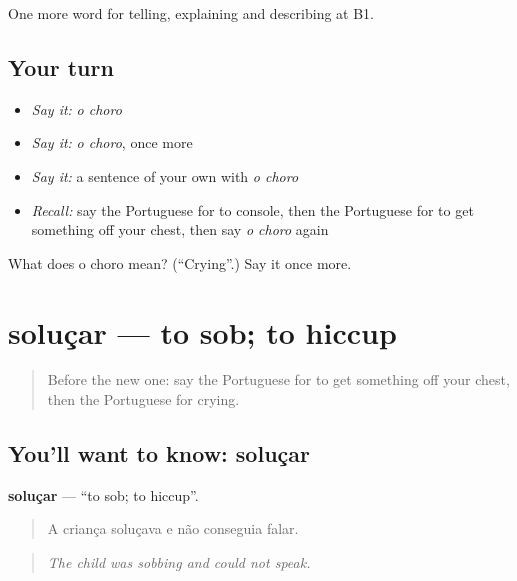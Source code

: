 \begin{grammarlens}[title={What you've built}]
One more word for telling, explaining and describing at B1.
\end{grammarlens}

\subsection*{Your turn}
\begin{itemize}
\raggedright
  \item \emph{Say it:} \emph{o choro}
  \item \emph{Say it:} \emph{o choro}, once more
  \item \emph{Say it:} a sentence of your own with \emph{o choro}
  \item \emph{Recall:} say the Portuguese for to console, then the Portuguese for to get something off your chest, then say \emph{o choro} again
\end{itemize}

\begin{tcolorbox}[breakable,colback=teal!4,colframe=teal!35!black,title={Before you move on}]
What does o choro mean? (\textquotedblleft{}Crying\textquotedblright{}.) Say it once more.
\end{tcolorbox}
\section[soluçar]{soluçar — to sob; to hiccup}

\label{lesson:PT-C477-solucar}



\begin{quote}
Before the new one: say the Portuguese for to get something off your chest, then the Portuguese for crying.
\end{quote}

\subsection*{You'll want to know: soluçar}
\textbf{soluçar} — \textquotedblleft{}to sob; to hiccup\textquotedblright{}.

\begin{quote}
A criança soluçava e não conseguia falar.
\end{quote}

\begin{quote}
\emph{The child was sobbing and could not speak.}
\end{quote}


